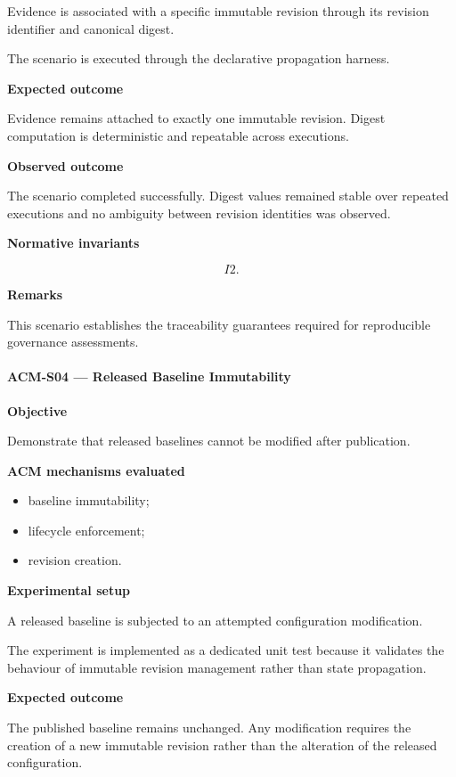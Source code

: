 \documentclass[10pt]{article}
\begin{document}
Evidence is associated with a specific immutable revision through its revision
identifier and canonical digest.

The scenario is executed through the declarative propagation harness.

\textbf{Expected outcome}

Evidence remains attached to exactly one immutable revision.
Digest computation is deterministic and repeatable across executions.

\textbf{Observed outcome}

The scenario completed successfully.
Digest values remained stable over repeated executions and no ambiguity between
revision identities was observed.

\textbf{Normative invariants}

\[
I2.
\]

\textbf{Remarks}

This scenario establishes the traceability guarantees required for reproducible
governance assessments.

\paragraph{ACM-S04 --- Released Baseline Immutability}

\textbf{Objective}

Demonstrate that released baselines cannot be modified after publication.

\textbf{ACM mechanisms evaluated}

\begin{itemize}
\item baseline immutability;
\item lifecycle enforcement;
\item revision creation.
\end{itemize}

\textbf{Experimental setup}

A released baseline is subjected to an attempted configuration modification.

The experiment is implemented as a dedicated unit test because it validates the
behaviour of immutable revision management rather than state propagation.

\textbf{Expected outcome}

The published baseline remains unchanged.
Any modification requires the creation of a new immutable revision rather than
the alteration of the released configuration.
\end{document}
